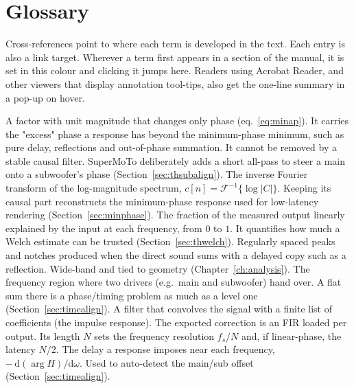 \chapter{Glossary}\label{ch:glossary}

Cross-references point to where each term is developed in the text. Each entry is also a link target. Wherever a term first appears in a section of the manual, it is set in \textcolor{smtgls}{this colour} and clicking it jumps here. Readers using Acrobat Reader, and other viewers that display annotation tool-tips, also get the one-line summary in a pop-up on hover.

\begin{description}[style=nextline, leftmargin=0pt, font=\normalfont\bfseries]
   A factor with unit magnitude that changes only phase (eq.~\eqref{eq:minap}). It carries the "excess" phase a response has beyond the minimum-phase minimum, such as pure delay, reflections and out-of-phase summation. It cannot be removed by a stable causal filter. SuperMoTo deliberately adds a short all-pass to steer a main onto a subwoofer's phase (Section~\ref{sec:thsubalign}).
   The inverse Fourier transform of the log-magnitude spectrum, $c[n]=\mathcal{F}^{-1}\{\log|C|\}$. Keeping its causal part reconstructs the minimum-phase response used for low-latency rendering (Section~\ref{sec:minphase}).
   The fraction of the measured output linearly explained by the input at each frequency, from $0$ to $1$. It quantifies how much a Welch estimate can be trusted (Section~\ref{sec:thwelch}).
   Regularly spaced peaks and notches produced when the direct sound sums with a delayed copy such as a reflection. Wide-band and tied to geometry (Chapter~\ref{ch:analysis}).
   The frequency region where two drivers (e.g.\ main and subwoofer) hand over. A flat sum there is a phase/timing problem as much as a level one (Section~\ref{sec:timealign}).
   A filter that convolves the signal with a finite list of coefficients (the impulse response). The exported correction is an FIR loaded per output. Its length $N$ sets the frequency resolution $f_s/N$ and, if linear-phase, the latency $N/2$.
   The delay a response imposes near each frequency, $-\,\mathrm{d}(\arg H)/\mathrm{d}\omega$. Used to auto-detect the main/sub offset (Section~\ref{sec:timealign}).

\end{description}
